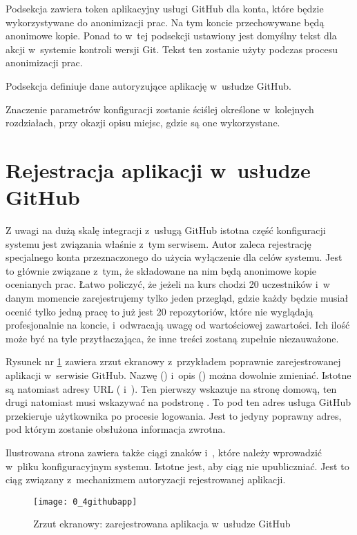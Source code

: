 Podsekcja  zawiera token aplikacyjny usługi GitHub dla konta, które będzie wykorzystywane do anonimizacji prac. Na tym koncie przechowywane będą anonimowe kopie. Ponad to w~tej podsekcji ustawiony jest domyślny tekst dla akcji  w~systemie kontroli wersji Git. Tekst ten zostanie użyty podczas procesu anonimizacji prac.

Podsekcja  definiuje dane autoryzujące aplikację w~usłudze GitHub.

\medskip
Znaczenie parametrów konfiguracji zostanie ściślej określone w~kolejnych rozdziałach, przy okazji opisu miejsc, gdzie są one wykorzystane.

\clearpage
\section{Rejestracja aplikacji w~usłudze GitHub}
Z uwagi na dużą skalę integracji z~usługą GitHub istotna część konfiguracji systemu jest związania właśnie z~tym serwisem. Autor zaleca rejestrację specjalnego konta przeznaczonego do użycia wyłączenie dla celów systemu. Jest to głównie związane z~tym, że składowane na nim będą anonimowe kopie ocenianych prac. Łatwo policzyć, że jeżeli na kurs chodzi 20 uczestników i~w danym momencie zarejestrujemy tylko jeden przegląd, gdzie każdy będzie musiał ocenić tylko jedną pracę to już jest 20 repozytoriów, które nie wyglądają profesjonalnie na koncie, i~odwracają uwagę od wartościowej zawartości. Ich ilość może być na tyle przytłaczająca, że inne treści zostaną zupełnie niezauważone.

\medskip
Rysunek nr \ref{obr04} zawiera zrzut ekranowy z~przykładem poprawnie zarejestrowanej aplikacji w~serwisie GitHub. Nazwę () i~opis () można dowolnie zmieniać. Istotne są natomiast adresy URL ( i~). Ten pierwszy wskazuje na stronę domową, ten drugi natomiast musi wskazywać na podstronę . To pod ten adres usługa GitHub przekieruje użytkownika po procesie logowania. Jest to jedyny poprawny adres, pod którym zostanie obsłużona informacja zwrotna.

\medskip
Ilustrowana strona zawiera także ciągi znaków  i~, które należy wprowadzić w~pliku konfiguracyjnym systemu. Istotne jest, aby ciąg  nie upubliczniać. Jest to ciąg związany z~mechanizmem autoryzacji  rejestrowanej aplikacji.

\begin{figure}[!h]
\centering
    \texttt{[image: 0\_4githubapp]}
    \caption{Zrzut ekranowy: zarejestrowana aplikacja w~usłudze GitHub}
    \label{obr04}
\end{figure}

